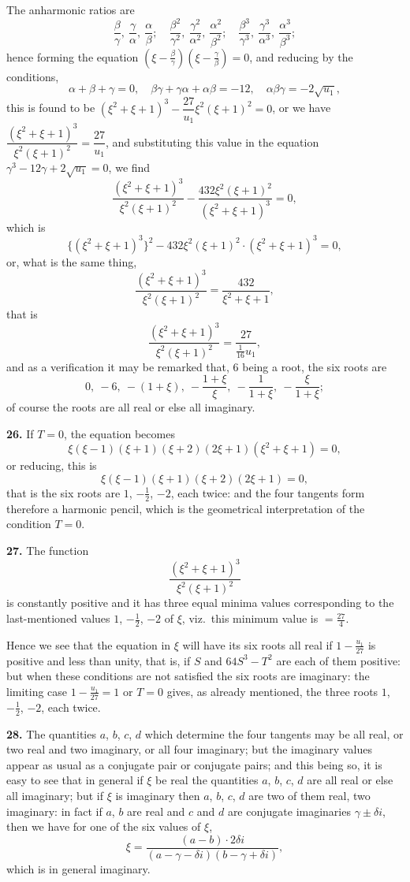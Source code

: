 \documentclass[11pt,a4paper]{article}
\theoremstyle{plain}
\begin{document}
The anharmonic ratios are
\[
\frac{\beta}{\gamma}, \ \frac{\gamma}{\alpha}, \ \frac{\alpha}{\beta}; \quad \frac{\beta^2}{\gamma^2}, \ \frac{\gamma^2}{\alpha^2}, \ \frac{\alpha^2}{\beta^2}; \quad \frac{\beta^3}{\gamma^3}, \ \frac{\gamma^3}{\alpha^3}, \ \frac{\alpha^3}{\beta^3};
\]
hence forming the equation $(\xi - \tfrac{\beta}{\gamma})(\xi - \tfrac{\gamma}{\beta}) = 0$, and reducing by the conditions,
\[
\alpha + \beta + \gamma = 0, \quad \beta\gamma + \gamma\alpha + \alpha\beta = -12, \quad \alpha\beta\gamma = -2\sqrt{u_1},
\]
this is found to be $(\xi^2+\xi+1)^3 - \dfrac{27}{u_1}\xi^2(\xi+1)^2 = 0$, or we have $\dfrac{(\xi^2+\xi+1)^3}{\xi^2(\xi+1)^2} = \dfrac{27}{u_1}$, and substituting this value in the equation $\gamma^3 - 12\gamma + 2\sqrt{u_1} = 0$, we find
\[
\frac{(\xi^2+\xi+1)^3}{\xi^2(\xi+1)^2} - \frac{432\xi^2(\xi+1)^2}{(\xi^2+\xi+1)^3} = 0,
\]
which is
\[
\{ (\xi^2+\xi+1)^3 \}^2 - 432\xi^2(\xi+1)^2 \cdot (\xi^2+\xi+1)^3 = 0,
\]
or, what is the same thing,
\[
\frac{(\xi^2+\xi+1)^3}{\xi^2(\xi+1)^2} = \frac{432}{\xi^2+\xi+1},
\]
that is
\[
\frac{(\xi^2+\xi+1)^3}{\xi^2(\xi+1)^2} = \frac{27}{\tfrac{1}{16}u_1},
\]
and as a verification it may be remarked that, 6 being a root, the six roots are
\[
0, \ -6, \ -(1+\xi), \ -\frac{1+\xi}{\xi}, \ -\frac{1}{1+\xi}, \ -\frac{\xi}{1+\xi};
\]
of course the roots are all real or else all imaginary.

\noindent\textbf{26.} If $T=0$, the equation becomes
\[
\xi(\xi-1)(\xi+1)(\xi+2)(2\xi+1)(\xi^2+\xi+1) = 0,
\]
or reducing, this is
\[
\xi(\xi-1)(\xi+1)(\xi+2)(2\xi+1) = 0,
\]
that is the six roots are $1$, $-\tfrac{1}{2}$, $-2$, each twice: and the four tangents form therefore a harmonic pencil, which is the geometrical interpretation of the condition $T=0$.

\noindent\textbf{27.} The function
\[
\frac{(\xi^2+\xi+1)^3}{\xi^2(\xi+1)^2}
\]
is constantly positive and it has three equal minima values corresponding to the last-mentioned values $1$, $-\tfrac{1}{2}$, $-2$ of $\xi$, viz.\ this minimum value is $= \tfrac{27}{4}$.

Hence we see that the equation in $\xi$ will have its six roots all real if $1 - \tfrac{u_1}{27}$ is positive and less than unity, that is, if $S$ and $64S^3-T^2$ are each of them positive: but when these conditions are not satisfied the six roots are imaginary: the limiting case $1 - \tfrac{u_1}{27} = 1$ or $T=0$ gives, as already mentioned, the three roots $1$, $-\tfrac{1}{2}$, $-2$, each twice.

\noindent\textbf{28.} The quantities $a$, $b$, $c$, $d$ which determine the four tangents may be all real, or two real and two imaginary, or all four imaginary; but the imaginary values appear as usual as a conjugate pair or conjugate pairs; and this being so, it is easy to see that in general if $\xi$ be real the quantities $a$, $b$, $c$, $d$ are all real or else all imaginary; but if $\xi$ is imaginary then $a$, $b$, $c$, $d$ are two of them real, two imaginary: in fact if $a$, $b$ are real and $c$ and $d$ are conjugate imaginaries $\gamma \pm \delta i$, then we have for one of the six values of $\xi$,
\[
\xi = \frac{(a-b) \cdot 2\delta i}{(a-\gamma-\delta i)(b-\gamma+\delta i)},
\]
which is in general imaginary.
\end{document}
